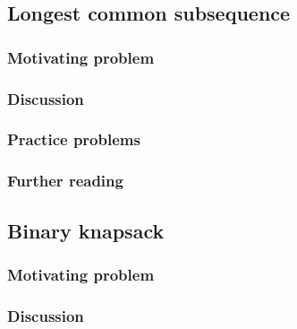 \subsection{Longest common subsequence}

\subsubsection*{Motivating problem}







\subsubsection*{Discussion}

\subsubsection*{Practice problems}

\subsubsection*{Further reading}

\subsection{Binary knapsack}

\subsubsection*{Motivating problem}







\subsubsection*{Discussion}

